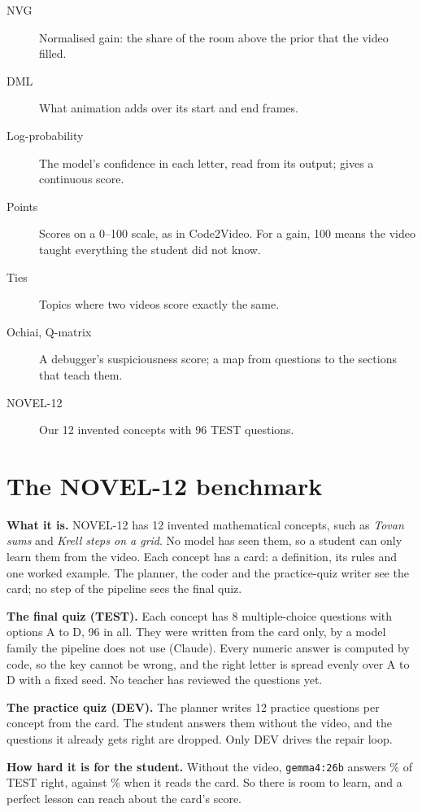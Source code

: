 \documentclass[11pt]{article}
\begin{document}
\begin{description}
  \item[NVG] Normalised gain: the share of the room above the prior that the video filled.
  \item[DML] What animation adds over its start and end frames.
  \item[Log-probability] The model's confidence in each letter, read from its output; gives a continuous score.
  \item[Points] Scores on a 0--100 scale, as in Code2Video. For a gain, 100 means the video taught everything the
  student did not know.
  \item[Ties] Topics where two videos score exactly the same.
  \item[Ochiai, Q-matrix] A debugger's suspiciousness score; a map from questions to the sections that teach them.
  \item[NOVEL-12] Our 12 invented concepts with 96 TEST questions.
\end{description}

\appendix
\section{The NOVEL-12 benchmark}\label{app:cards}
\textbf{What it is.} NOVEL-12 has 12 invented mathematical concepts, such as \emph{Tovan sums} and \emph{Krell steps on
a grid}. No model has seen them, so a student can only learn them from the video. Each concept has a card: a
definition, its rules and one worked example. The planner, the coder and the practice-quiz writer see the card; no step
of the pipeline sees the final quiz.

\textbf{The final quiz (TEST).} Each concept has 8 multiple-choice questions with options A to D, 96 in all. They were
written from the card only, by a model family the pipeline does not use (Claude). Every numeric answer is computed by
code, so the key cannot be wrong, and the right letter is spread evenly over A to D with a fixed seed. No teacher has
reviewed the questions yet.

\textbf{The practice quiz (DEV).} The planner writes 12 practice questions per concept from the card. The student
answers them without the video, and the questions it already gets right are dropped. Only DEV drives the repair loop.

\textbf{How hard it is for the student.} Without the video, \texttt{gemma4:26b} answers \novelpriorGemmaAcc\% of TEST
right, against \novelcardGemmaAcc\% when it reads the card. So there is room to learn, and a perfect lesson can reach
about the card's score.
\end{document}
